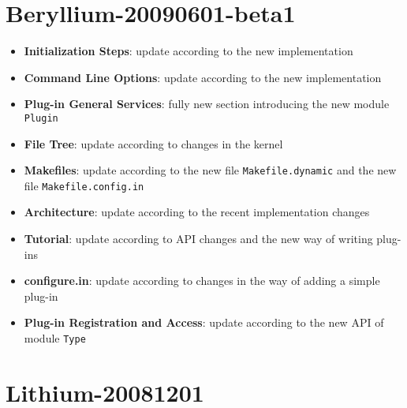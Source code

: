 \section*{Beryllium-20090601-beta1}

\begin{itemize}
\item \textbf{Initialization Steps}: update according to the new implementation
\item \textbf{Command Line Options}: update according to the new implementation
\item \textbf{Plug-in General Services}: fully new section introducing the new
  module \texttt{Plugin}
\item \textbf{File Tree}: update according to changes in the kernel
\item \textbf{Makefiles}: update according to the new file
  \texttt{Makefile.dynamic} and the new file \texttt{Makefile.config.in}
\item \textbf{Architecture}: update according to the recent implementation
  changes
\item \textbf{Tutorial}: update according to API changes and the new way of
  writing plug-ins
\item \textbf{configure.in}: update according to changes in the way of adding a
  simple plug-in
\item \textbf{Plug-in Registration and Access}: update according to the new API
  of module \texttt{Type}
\end{itemize}

\section*{Lithium-20081201}

